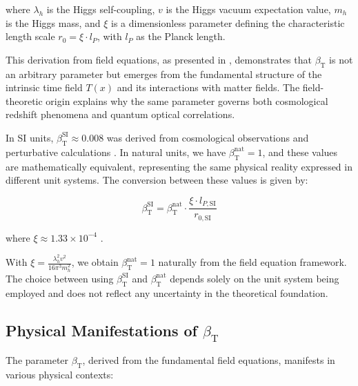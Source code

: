 \documentclass[12pt,a4paper]{article}
\newcommand{\Tfield}{T(x)}
\newcommand{\betaT}{\beta_{\text{T}}}
\begin{document}
	where \(\lambda_h\) is the Higgs self-coupling, \(v\) is the Higgs vacuum expectation value, \(m_h\) is the Higgs mass, and \(\xi\) is a dimensionless parameter defining the characteristic length scale \(r_0 = \xi \cdot l_P\), with \(l_P\) as the Planck length.
	
	This derivation from field equations, as presented in \cite{pascher_photons_2025}, demonstrates that \(\betaT\) is not an arbitrary parameter but emerges from the fundamental structure of the intrinsic time field \(\Tfield\) and its interactions with matter fields. The field-theoretic origin explains why the same parameter governs both cosmological redshift phenomena and quantum optical correlations.
	
	In SI units, \(\betaT^{\text{SI}} \approx 0.008\) was derived from cosmological observations and perturbative calculations \cite{pascher_params_2025}. In natural units, we have \(\betaT^{\text{nat}} = 1\), and these values are mathematically equivalent, representing the same physical reality expressed in different unit systems. The conversion between these values is given by:
	
	\begin{equation}
		\betaT^{\text{SI}} = \betaT^{\text{nat}} \cdot \frac{\xi \cdot l_{P,\text{SI}}}{r_{0,\text{SI}}}
	\end{equation}
	
	where \(\xi \approx 1.33 \times 10^{-4}\) \cite{pascher_photons_2025}.
	
	With \(\xi = \frac{\lambda_h^2 v^2}{16\pi^3 m_h^2}\), we obtain \(\betaT^{\text{nat}} = 1\) naturally from the field equation framework. The choice between using \(\betaT^{\text{SI}}\) and \(\betaT^{\text{nat}}\) depends solely on the unit system being employed and does not reflect any uncertainty in the theoretical foundation.
	
	\subsection{Physical Manifestations of \(\betaT\)}
	\label{subsec:beta_manifestations}
	
	The parameter \(\betaT\), derived from the fundamental field equations, manifests in various physical contexts:
	
\end{document}

